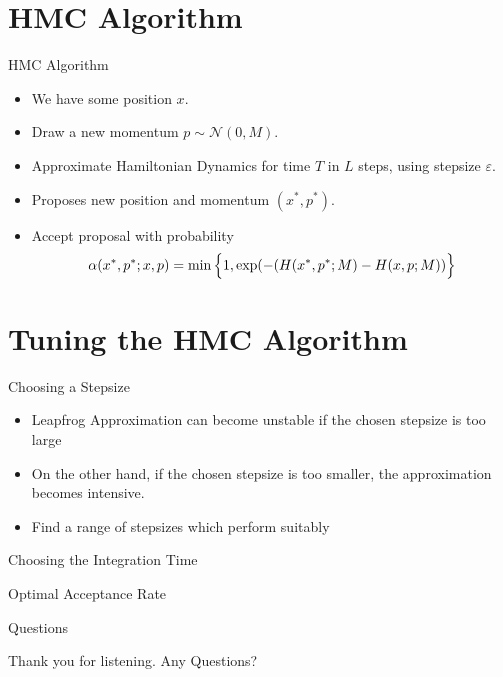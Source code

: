 \documentclass{beamer}
\begin{document}
\section{HMC Algorithm}

\begin{frame}{HMC Algorithm}
\begin{itemize}

\item We have some position $x$.

\item Draw a new momentum $ p \sim \mathcal{N}(0, M)$.

\item Approximate Hamiltonian Dynamics for time $T$ in $L$ steps, using stepsize $\varepsilon$. 

\item Proposes new position and momentum $(x^{*}, p^{*})$. 

\item Accept proposal with probability $$ \alpha(x^{*}, p^{*} ;x, p) = \min \Big{\{} 1, \exp(-(H(x^{*}, p^{*};M) - H(x,p;M)) \Big{\}} $$
\end{itemize}

\end{frame}


\section{Tuning the HMC Algorithm}

\begin{frame}{Choosing a Stepsize}

\begin{itemize}
\item Leapfrog Approximation can become unstable if the chosen stepsize is too large

\item On the other hand,  if the chosen stepsize is too smaller, the approximation becomes intensive.

\item Find a range of stepsizes which perform suitably
\end{itemize}

\end{frame}


\begin{frame}{Choosing the Integration Time}


\end{frame}


\begin{frame}{Optimal Acceptance Rate}

\end{frame}


\begin{frame}{Questions}

\begin{center}
Thank you for listening.
\vskip 0.5cm
Any Questions?

\end{center}

\end{frame}
\end{document}
